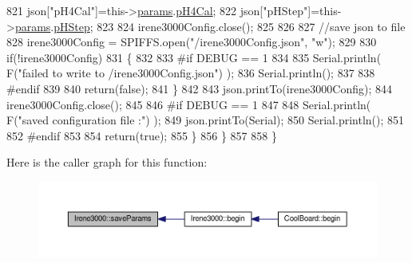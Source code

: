 \begin{DoxyCode}
821             json[\textcolor{stringliteral}{"pH4Cal"}]=this->\hyperlink{class_irene3000_a136585a5ee7f9ac6ab52175fa153f8e3}{params}.\hyperlink{struct_irene3000_1_1parameters___t_a1144de6fb54eb3e1dd2a3d8c2afc97dc}{pH4Cal};
822             json[\textcolor{stringliteral}{"pHStep"}]=this->\hyperlink{class_irene3000_a136585a5ee7f9ac6ab52175fa153f8e3}{params}.\hyperlink{struct_irene3000_1_1parameters___t_a61cfcc2539d5f630e9071f3753aba9fe}{pHStep};         
823             
824             irene3000Config.close();
825             
826             
827             \textcolor{comment}{//save json to file}
828             irene3000Config = SPIFFS.open(\textcolor{stringliteral}{"/irene3000Config.json"}, \textcolor{stringliteral}{"w"});
829 
830             \textcolor{keywordflow}{if}(!irene3000Config)
831             \{
832             
833 \textcolor{preprocessor}{            #if DEBUG == 1}
834 
835                 Serial.println( F(\textcolor{stringliteral}{"failed to write to /irene3000Config.json"}) );
836                 Serial.println();
837             
838 \textcolor{preprocessor}{            #endif }
839 
840                 \textcolor{keywordflow}{return}(\textcolor{keyword}{false});
841             \}
842 
843             json.printTo(irene3000Config);
844             irene3000Config.close();
845             
846 \textcolor{preprocessor}{        #if DEBUG == 1 }
847 
848             Serial.println( F(\textcolor{stringliteral}{"saved configuration file :"})  );
849             json.printTo(Serial);
850             Serial.println();
851         
852 \textcolor{preprocessor}{        #endif}
853 
854             \textcolor{keywordflow}{return}(\textcolor{keyword}{true}); 
855         \}
856     \}   
857 
858 \}
\end{DoxyCode}
Here is the caller graph for this function\+:\nopagebreak
\begin{figure}[H]
\begin{center}
\leavevmode
\includegraphics[width=350pt]{d6/d03/class_irene3000_a63dbd38e79b8cd5f1fba4b245501a894_icgraph}
\end{center}
\end{figure}
\mbox{\label{class_irene3000_aff7c5da186b388e7272e63ff88a20c34}} 
